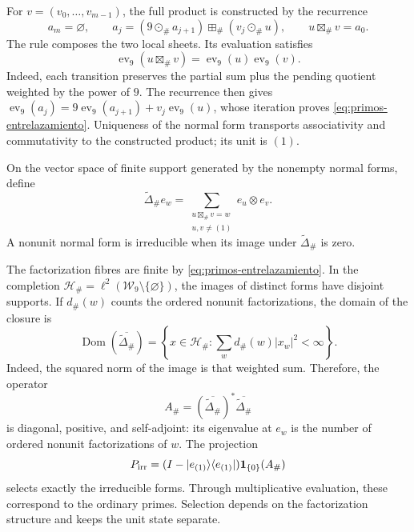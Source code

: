 For \(v=(v_0,\ldots,v_{m-1})\), the full product is constructed by
the recurrence
\[
 a_m=\varnothing,\qquad
 a_j=(9\odot_\#a_{j+1})\boxplus_\#(v_j\odot_\#u),
 \qquad u\boxtimes_\#v=a_0.
\]
The rule composes the two local sheets. Its evaluation satisfies
\begin{equation}
 \operatorname{ev}_9(u\boxtimes_\#v)
   =\operatorname{ev}_9(u)\operatorname{ev}_9(v).
 \label{eq:primos-entrelazamiento}
\end{equation}
Indeed, each transition preserves the partial sum plus the pending
quotient weighted by the power of \(9\). The recurrence then gives
\(\operatorname{ev}_9(a_j)=9\operatorname{ev}_9(a_{j+1})+
v_j\operatorname{ev}_9(u)\), whose iteration proves
\eqref{eq:primos-entrelazamiento}. Uniqueness of the normal form transports
associativity and commutativity to the constructed product; its unit is \((1)\).

\begin{definition}
On the vector space of finite support generated by the nonempty
normal forms, define
\[
 \widetilde\Delta_\# e_w
 =\sum_{\substack{u\boxtimes_\#v=w\\u,v\ne(1)}}e_u\otimes e_v.
\]
A nonunit normal form is irreducible when its image under
\(\widetilde\Delta_\#\) is zero.
\end{definition}

The factorization fibres are finite by
\eqref{eq:primos-entrelazamiento}. In the completion
\(\mathcal H_\#=\ell^2(\mathcal W_9\setminus\{\varnothing\})\),
the images of distinct forms have disjoint supports. If
\(d_\#(w)\) counts the ordered nonunit factorizations, the domain
of the closure is
\[
 \operatorname{Dom}(\overline{\widetilde\Delta_\#})
 =\left\{x\in\mathcal H_\#:
       \sum_w d_\#(w)|x_w|^2<\infty\right\}.
\]
Indeed, the squared norm of the image is that weighted sum. Therefore,
the operator
\[
 A_\#=(\overline{\widetilde\Delta_\#})^*
                  \overline{\widetilde\Delta_\#}
\]
is diagonal, positive, and self-adjoint: its eigenvalue at \(e_w\) is the
number of ordered nonunit factorizations of \(w\). The projection
\[
 P_{\rm irr}=(I-|e_{(1)}\rangle\langle e_{(1)}|)
                    \mathbf1_{\{0\}}(A_\#)
\]
selects exactly the irreducible forms. Through multiplicative
evaluation, these correspond to the ordinary primes. Selection
depends on the factorization structure and keeps the unit
state separate.

